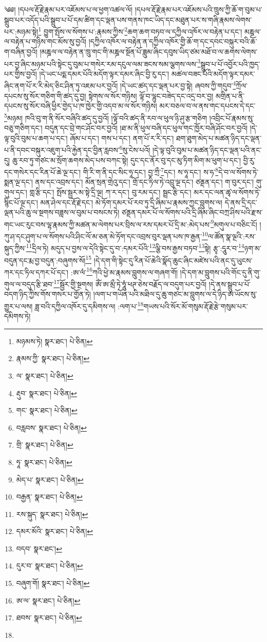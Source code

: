 \setcounter{footnote}{0} 
༄༅། །དཔལ་རྡོ་རྗེ་རྣམ་པར་འཇོམས་པ་ལ་ཕྱག་འཚལ་ལོ། །དཔལ་རྡོ་རྗེ་རྣམ་པར་འཇོམས་པའི་ཁྲུས་ཀྱི་ཆོ་ག་བུམ་པ་སྒྲུབ་པར་འདོད་པའི་སྒྲུབ་པ་པོ་དམ་ཚིག་དང་ལྡན་པས་གནས་ཁང་ཡིད་དང་མཐུན་པར་ས་གཞི་རྣམས་ལེགས་པར་:མཉམ་སྟེ།\footnote{མཉམས་ཏེ།  སྣར་ཐང་།  པེ་ཅིན། } བྱུག་སྤོས་ལ་སོགས་པ་:རྣམས་ཀྱིས་\footnote{རྣམས་ཀྱི་  སྣར་ཐང་།  པེ་ཅིན། }ཆག་ཆག་བཏབ་ལ་དཀྱིལ་འཁོར་ལ་བརྟེན་པ་དང་། མཎྜལ་ལ་བརྟེན་པ་གཉིས་གང་མོས་སུ་བྱའོ། །དཀྱིལ་འཁོར་ལ་བརྟེན་ན་དཀྱིལ་འཁོར་གྱི་ཆོ་ག་དང་དབང་བསྐུར་བའི་ཆོ་ག་བཞིན་བྱའོ། །མཎྜལ་ལ་བརྟེན་ན་ཁྲུ་གང་གི་མཎྜལ་སྔོན་པོ་ཟླུམ་ཞིང་དབུས་ཡིད་ཙམ་མཐོ་བ་ལ་ཆགས་ལེགས་པར་བྱ་ཞིང་མཉམ་པའི་སྟེང་དུ་བུམ་པ་གསེར་རམ་དངུལ་ལམ་ཟངས་སམ་ལྕགས་ལས་\footnote{ལ་  སྣར་ཐང་།  པེ་ཅིན། }སྒྲུབ་པ་པོ་འབྱོར་པའི་ཁྱད་པར་གྱིས་བྱའོ། །དེ་ཡང་པདྨ་དམར་པོའི་མདོག་ལྟར་དམར་ཞིང་བྱི་རུ་དང་། མཚལ་བཟང་པོའི་མདོག་ལྟར་དམར་ཞིང་ནག་པོ་ར་རི་མེད་ཅིང་ཤིན་ཏུ་འཇམ་པར་བྱའོ། །དེ་ཡང་ཚད་དང་ལྡན་པར་བྱ་སྟེ། ཞབས་ཀྱི་གདུབ་\footnote{རྡུབ་  སྣར་ཐང་།  པེ་ཅིན། }ཀྲོལ་དཔངས་སུ་སོར་གཅིག་གི་ཚད་དུ་བྱ། སྟེགས་ལ་སོར་གཉིས། ལྟོ་བ་ལྷུང་བཟེད་དང་འདྲ་བར་བྱ། མགྲིན་པ་ནི་དཔངས་སུ་སོར་བཞི་ཕྱིར་གྱེད་པ་ཁ་ཁྱེར་གྱི་འདབ་མ་ལ་སོར་གཉིས། མར་བཅལ་བ་ལ་ནས་གང་དཔངས་དེ་དང་\footnote{གང་  སྣར་ཐང་།  པེ་ཅིན། }མཉམ། ཁའི་བུ་ག་ནི་སོར་བཞིའི་ཚད་དུ་བྱའོ། །ལྟོ་བའི་ཚད་ནི་རབ་ལ་ཕུལ་ཉི་ཤུ་རྩ་གཅིག །འབྲིང་པོ་རྣམས་སུ་བཅུ་གཅིག་དང་། བདུན་དང་བྲེ་གང་ཤོང་བར་བྱའོ། །ཐ་མ་ནི་ཕུལ་བཞི་དང་ཕུལ་གང་ཁྱོར་བཞི་ཤོང་བར་བྱའོ། །དེ་ལྟ་བུའི་བུམ་པ་ཆག་པ་དང་། ཞོམ་པ་དང་། གས་པ་དང་། ནག་པོ་ར་རི་དང་། ཐག་ཐུག་མེད་པ་མཚན་ཉིད་དང་ལྡན་པ་ནི་དབང་བསྐུར་འཇུག་པའི་རྐྱེན་དང་བྱིན་རླབས་\footnote{བརླབས་  སྣར་ཐང་།  པེ་ཅིན། }སུ་ངེས་པའོ། །དེ་ལྟ་བུའི་བུམ་པ་མཚན་ཉིད་དང་ལྡན་པའི་ནང་དུ། ཆུ་རབ་ཏུ་གཙང་མ་སྲོག་ཆགས་མེད་པས་བཀང་སྟེ། དུང་དང་ནོར་བུ་དང་མུ་ཏིག་མིག་མ་ཕུག་པ་དང་། བྱི་རུ་དང་གསེར་དང་རིན་པོ་ཆེ་ལྔ་དང་། གི་རི་ག་ནི་དང་སིང་ཧཱ་དང་། བྱ་ཀྲྀ་\footnote{གྲི་  སྣར་ཐང་།  པེ་ཅིན། }དང་། ས་ཧཱ་དང་། ས་ཧ་\footnote{ཧཱ་  སྣར་ཐང་།  པེ་ཅིན། }དེ་བ་ལ་སོགས་ཏེ་སྨན་ལྔ་དང་། ནས་དང་འབྲས་དང་། མོན་སྲན་གྲེའུ་དང་། གྲོ་དང་ཏིལ་ཏེ་འབྲུ་ལྔ་དང་། ཙནྡན་དང་། ག་བུར་དང་། གུ་གུལ་དང་། གླ་རྩི་དང་། སྤོས་སྦྱར་མ་སྟེ་དྲི་ལྔ། ཀ་ར་དང་། བུ་རམ་དང་། སྦྲང་རྩི་དང་། མར་དང་ལན་ཚྭ་ལ་སོགས་ཏེ་སྙིང་པོ་ལྔ་དང་། མན་ཤེལ་དང་རྡོ་རྗེ་དང་། མེ་ཏོག་དམར་པོ་རབ་ཏུ་དྲི་ཞིམ་པ་རྣམས་ཀྱང་བླུགས་ལ། དེ་ནས་དྲི་དང་ལྡན་པའི་ཆུ་ལ་སྔགས་བཟླས་ལ་བུམ་པ་བསངས་ཏེ། ཙནྡན་དམར་པོ་ལ་སོགས་པའི་དྲི་ཞིམ་ཞིང་བཀྲ་ཤིས་པའི་རྫས་གང་ཡང་རུང་བས་ལྷ་རྣམས་ཀྱི་མཚན་མ་ལེགས་པར་བྲིས་ལ་རས་དམར་པོ་དྲི་མ་:མེད་པས་\footnote{མེད་པ་  སྣར་ཐང་།  པེ་ཅིན། }མགུལ་པ་བཅིང་ངོ། །ཀུ་ཤ་དང་ཤུག་པ་ལ་སོགས་པའི་ཤིང་ལོ་མ་ཅན་མེ་ཏོག་དང་འབྲས་བུར་ལྡན་པས་ཁ་རྒྱན་\footnote{བརྒྱན་  སྣར་ཐང་།  པེ་ཅིན། }ལ་ཚོན་སྣ་ལྔའི་:རས་སྐུད་ཀྱིས་\footnote{རས་སྐུད་  སྣར་ཐང་།  པེ་ཅིན། }དྲིལ་ཏེ། མདུད་པ་བྱས་ལ་དེའི་སྟེང་དུ་བ་:དམར་པོའི་\footnote{དམར་མོའི་  སྣར་ཐང་།  པེ་ཅིན། }ལྕི་བས་རྒྱས་བཏབ་\footnote{བདབ་  སྣར་ཐང་། }སྟེ། རྩྭ་:དཱུར་བ་\footnote{དུར་བ་  སྣར་ཐང་།  པེ་ཅིན། }ཉག་མ་བདུན་དང་རྨ་བྱ་བདུན་:བཞུགས་སོ།\footnote{བཞུག་གོ།  སྣར་ཐང་།  པེ་ཅིན། } །དེ་དག་གི་སྟེང་དུ་རིན་པོ་ཆེའི་སྣོད་ཆུང་ཞིང་མཛེས་པའི་ནང་དུ་ཡུངས་ཀར་དང་ཏིལ་དཀར་པོ་དང་། :ཨ་ལཾ་\footnote{ཨ་ལ་  སྣར་ཐང་།  པེ་ཅིན། }ཀའི་ཕྱེ་མ་རྣམས་བླུགས་ལ་གཞག་གོ། །དེ་དག་མ་བླུགས་པའི་གོང་དུ་ནི་གུ་གུལ་ལ་བདུད་རྩི་ཐབ་\footnote{ཐབས་  སྣར་ཐང་།  པེ་ཅིན། }སྦྱོར་གྱི་སྔགས། ཨོཾ་ཨ་མྲྀ་ཏེ་ཧཱུཾ་ཕཊ་ཅེས་བརྗོད་ལ་བདུག་པར་བྱའོ། །དེ་ནས་སྒྲུབ་པ་པོ་བདག་ཉིད་ཀྱིས་གོས་གསར་པ་གྱོན་ཏེ། །ལག་པ་གཡོན་པའི་མཐིལ་དུ་ཆུ་གཙང་མ་བླུགས་ལ་དེ་ཉིད་ཨ་ཡོངས་སུ་གྱུར་པ་ལས། ཟླ་བའི་དཀྱིལ་འཁོར་དུ་དམིགས་ལ། :ལག་པ་\footnote{}གཡས་པའི་སོར་མོ་གསུམ་རྡོ་རྗེ་རྩེ་གསུམ་པར་དམིགས་ཏེ། 